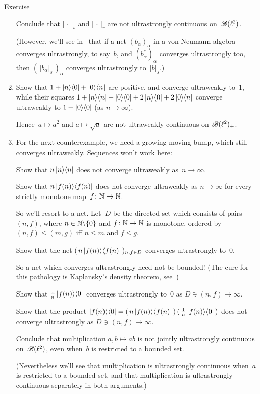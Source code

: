 \documentclass[a]{subfiles}
\begin{document}
\begin{parsec}
\begin{point}{Exercise}
\begin{enumerate}
Conclude that $\left|\,\cdot\,\right|_s$
and $\left|\,\cdot\,\right|_r$
are not ultrastrongly continuous on~$\mathscr{B}(\ell^2)$.

(However, we'll see in~\TODO{}
that if a net $(b_\alpha)_\alpha$
in a von Neumann algebra
converges ultrastrongly, to say~$b$,
and $(b_\alpha^*)_\alpha$
converges ultrastrongly too,
then $(\,\left|b_\alpha\right|_s\,)_\alpha$
converges ultrastrongly to~$\left|b\right|_s$.)

\item
Show that $1+\left|n\right>\!\left<0\right|+\left|0\right>\!\left<n\right|$
are positive,
and 
converge ultraweakly to~$1$,
while their squares
$1+\left|n\right>\!\left<n\right|+\left|0\right>\!\left<0\right|+2\left|n\right>\!\left<0\right|+2\left|0\right>\!\left<n\right|$
converge ultraweakly to $1+\left|0\right>\!\left<0\right|$
(as $n\to\infty$).

Hence~$a\mapsto a^2$
and $a\mapsto \sqrt{a}$
are not ultraweakly continuous on $\mathscr{B}(\ell^2)_{+}$.

\item
For the next counterexample,
we need a growing moving bump,
which still converges ultraweakly.
Sequences won't work here:

Show that $n\left|n\right>\!\left<n\right|$ does not converge ultraweakly as~$n\to\infty$.

Show that $n \left|f(n)\right>\!\left<f(n)\right|$ does not converge ultraweakly
as $n\to\infty$
for every strictly monotone map~$f\colon \mathbb{N}\to\mathbb{N}$.

So we'll resort to a net.
Let~$D$ be the directed set which consists of pairs $(n,f)$,
where $n\in \mathbb{N}\backslash\{0\}$ and $f\colon \mathbb{N}\to\mathbb{N}$
is monotone, ordered by $(n,f)\leq (m,g)$ iff $n\leq m$ and $f\leq g$.

Show that the net $(\, n\left|f(n)\right>\!\left<f(n)\right|\,)_{n,f\in D}$
converges ultrastrongly to~$0$.

So a net which converges ultrastrongly need not be bounded!
(The cure for this pathology is Kaplansky's density theorem, 
see~)

Show that $\frac{1}{n} \left|f(n)\right>\!\left<0\right|$
converges ultrastrongly to~$0$ as $D\ni(n,f)\to \infty$.

Show that the product
$\left|f(n)\right>\!\left<0\right| = (\,n\left|f(n)\right>\!\left<f(n)\right|\,)\,(\,\frac{1}{n}
\left|f(n)\right>\!\left<0\right|\,)$
does not converge ultrastrongly 
as $D\ni(n,f)\to\infty$.

Conclude that multiplication $a,b\mapsto ab$
is not jointly ultrastrongly continuous on~$\mathscr{B}(\ell^2)$,
even when~$b$ is restricted to a bounded set.

(Nevertheless we'll see that multiplication is ultrastrongly continuous
when~$a$ is restricted to a bounded set,
and that multiplication is ultrastrongly continuous
separately in both arguments.)


\end{enumerate}
\end{point}
\end{parsec}
\end{document}
